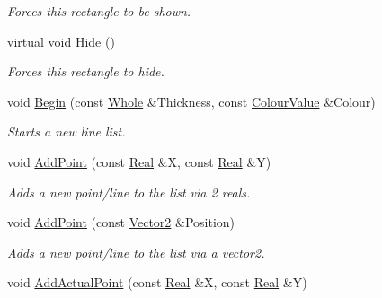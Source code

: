 \begin{DoxyCompactItemize}
\begin{DoxyCompactList}\small\item\em Forces this rectangle to be shown. \item\end{DoxyCompactList}\item 
\hypertarget{classphys_1_1UI_1_1LineList_a4e1d09adc4ed6947d93ae6030e00263e}{
virtual void \hyperlink{classphys_1_1UI_1_1LineList_a4e1d09adc4ed6947d93ae6030e00263e}{Hide} ()}
\label{d7/de8/classphys_1_1UI_1_1LineList_a4e1d09adc4ed6947d93ae6030e00263e}

\begin{DoxyCompactList}\small\item\em Forces this rectangle to hide. \item\end{DoxyCompactList}\item 
void \hyperlink{classphys_1_1UI_1_1LineList_adb0f29fc8f83baeec9f36f4e99e04a53}{Begin} (const \hyperlink{namespacephys_a460f6bc24c8dd347b05e0366ae34f34a}{Whole} \&Thickness, const \hyperlink{classphys_1_1ColourValue}{ColourValue} \&Colour)
\begin{DoxyCompactList}\small\item\em Starts a new line list. \item\end{DoxyCompactList}\item 
void \hyperlink{classphys_1_1UI_1_1LineList_a9e706df0f3c6419b64cf136b688fe5aa}{AddPoint} (const \hyperlink{namespacephys_af7eb897198d265b8e868f45240230d5f}{Real} \&X, const \hyperlink{namespacephys_af7eb897198d265b8e868f45240230d5f}{Real} \&Y)
\begin{DoxyCompactList}\small\item\em Adds a new point/line to the list via 2 reals. \item\end{DoxyCompactList}\item 
void \hyperlink{classphys_1_1UI_1_1LineList_a586b848c2eeebeead80d3f5f3fd05ad5}{AddPoint} (const \hyperlink{classphys_1_1Vector2}{Vector2} \&Position)
\begin{DoxyCompactList}\small\item\em Adds a new point/line to the list via a vector2. \item\end{DoxyCompactList}\item 
void \hyperlink{classphys_1_1UI_1_1LineList_a2bb72fa96c9ed9ea64c78eb8286fd713}{AddActualPoint} (const \hyperlink{namespacephys_af7eb897198d265b8e868f45240230d5f}{Real} \&X, const \hyperlink{namespacephys_af7eb897198d265b8e868f45240230d5f}{Real} \&Y)

\end{DoxyCompactItemize}
